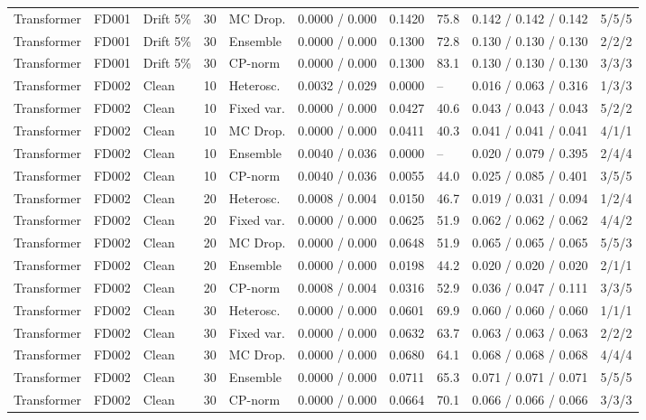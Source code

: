 \documentclass[10pt,a4paper]{article}
\begin{document}
\begin{landscape}
\begin{center}
\begin{longtable}{lllllcclll}
Transformer & FD001 & Drift 5\% & 30 & MC Drop. & 0.0000 / 0.000 & 0.1420 & 75.8 & 0.142 / 0.142 / 0.142 & 5/5/5 \\
Transformer & FD001 & Drift 5\% & 30 & Ensemble & 0.0000 / 0.000 & 0.1300 & 72.8 & 0.130 / 0.130 / 0.130 & 2/2/2 \\
Transformer & FD001 & Drift 5\% & 30 & CP-norm & 0.0000 / 0.000 & 0.1300 & 83.1 & 0.130 / 0.130 / 0.130 & 3/3/3 \\
Transformer & FD002 & Clean & 10 & Heterosc. & 0.0032 / 0.029 & 0.0000 & -- & 0.016 / 0.063 / 0.316 & 1/3/3 \\
Transformer & FD002 & Clean & 10 & Fixed var. & 0.0000 / 0.000 & 0.0427 & 40.6 & 0.043 / 0.043 / 0.043 & 5/2/2 \\
Transformer & FD002 & Clean & 10 & MC Drop. & 0.0000 / 0.000 & 0.0411 & 40.3 & 0.041 / 0.041 / 0.041 & 4/1/1 \\
Transformer & FD002 & Clean & 10 & Ensemble & 0.0040 / 0.036 & 0.0000 & -- & 0.020 / 0.079 / 0.395 & 2/4/4 \\
Transformer & FD002 & Clean & 10 & CP-norm & 0.0040 / 0.036 & 0.0055 & 44.0 & 0.025 / 0.085 / 0.401 & 3/5/5 \\
Transformer & FD002 & Clean & 20 & Heterosc. & 0.0008 / 0.004 & 0.0150 & 46.7 & 0.019 / 0.031 / 0.094 & 1/2/4 \\
Transformer & FD002 & Clean & 20 & Fixed var. & 0.0000 / 0.000 & 0.0625 & 51.9 & 0.062 / 0.062 / 0.062 & 4/4/2 \\
Transformer & FD002 & Clean & 20 & MC Drop. & 0.0000 / 0.000 & 0.0648 & 51.9 & 0.065 / 0.065 / 0.065 & 5/5/3 \\
Transformer & FD002 & Clean & 20 & Ensemble & 0.0000 / 0.000 & 0.0198 & 44.2 & 0.020 / 0.020 / 0.020 & 2/1/1 \\
Transformer & FD002 & Clean & 20 & CP-norm & 0.0008 / 0.004 & 0.0316 & 52.9 & 0.036 / 0.047 / 0.111 & 3/3/5 \\
Transformer & FD002 & Clean & 30 & Heterosc. & 0.0000 / 0.000 & 0.0601 & 69.9 & 0.060 / 0.060 / 0.060 & 1/1/1 \\
Transformer & FD002 & Clean & 30 & Fixed var. & 0.0000 / 0.000 & 0.0632 & 63.7 & 0.063 / 0.063 / 0.063 & 2/2/2 \\
Transformer & FD002 & Clean & 30 & MC Drop. & 0.0000 / 0.000 & 0.0680 & 64.1 & 0.068 / 0.068 / 0.068 & 4/4/4 \\
Transformer & FD002 & Clean & 30 & Ensemble & 0.0000 / 0.000 & 0.0711 & 65.3 & 0.071 / 0.071 / 0.071 & 5/5/5 \\
Transformer & FD002 & Clean & 30 & CP-norm & 0.0000 / 0.000 & 0.0664 & 70.1 & 0.066 / 0.066 / 0.066 & 3/3/3 \\

\end{longtable}
\end{center}
\end{landscape}
\end{document}
